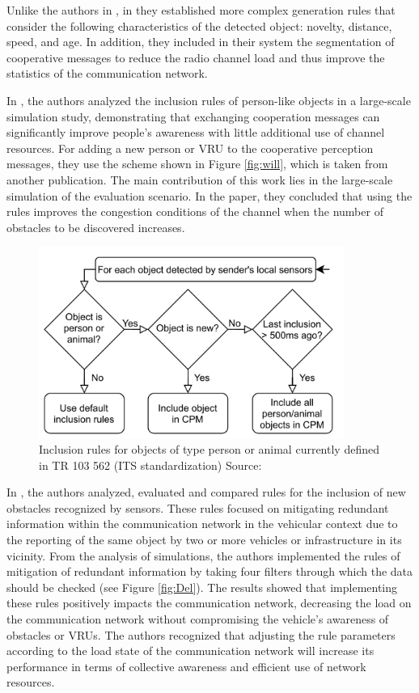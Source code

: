 Unlike the authors in \cite{Thandavarayan2019}, in \cite{Garlichs2019} they established more complex generation rules that consider the following characteristics of the detected object: novelty, distance, speed, and age. In addition, they included in their system the segmentation of cooperative messages to reduce the radio channel load and thus improve the statistics of the communication network. 

In \cite{Willecke2021}, the authors analyzed the inclusion rules of person-like objects in a large-scale simulation study, demonstrating that exchanging cooperation messages can significantly improve people's awareness with little additional use of channel resources. For adding a new person or VRU to the cooperative perception messages, they use the scheme shown in Figure \ref{fig:will}, which is taken from another publication. The main contribution of this work lies in the large-scale simulation of the evaluation scenario. In the paper, they concluded that using the rules improves the congestion conditions of the channel when the number of obstacles to be discovered increases. 

\begin{figure}[ht!]
    \centering
    \includegraphics[width=10cm]{FIGURES/Fig10.png}
    \caption{Inclusion rules for objects of type person or animal currently defined in TR 103 562 (ITS standardization) Source: \cite{Willecke2021}}
    \label{fig:Will}
\end{figure}

In \cite{Delooz2022}, the authors analyzed, evaluated and compared rules for the inclusion of new obstacles recognized by sensors. These rules focused on mitigating redundant information within the communication network in the vehicular context due to the reporting of the same object by two or more vehicles or infrastructure in its vicinity. From the analysis of simulations, the authors implemented the rules of mitigation of redundant information by taking four filters through which the data should be checked (see Figure \ref{fig:Del}). The results showed that implementing these rules positively impacts the communication network, decreasing the load on the communication network without compromising the vehicle's awareness of obstacles or VRUs. The authors recognized that adjusting the rule parameters according to the load state of the communication network will increase its performance in terms of collective awareness and efficient use of network resources.  

